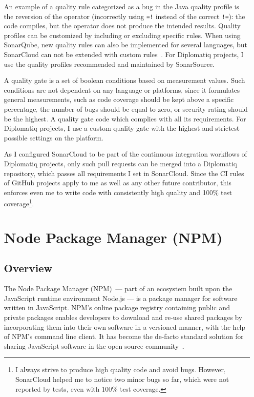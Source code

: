 An example of a quality rule categorized as a bug in the Java quality profile is the reversion of the  operator (incorrectly using \lstinline{=!} instead of the correct \lstinline{!=}): the code compiles, but the operator does not produce the intended results. Quality profiles can be customized by including or excluding specific rules. When using SonarQube, new quality rules can also be implemented for several languages, but SonarCloud can not be extended with custom rules~\cite{sonar-custom-rules}. For Diplomatiq projects, I use the quality profiles recommended and maintained by SonarSource.

A quality gate is a set of boolean conditions based on measurement values. Such conditions are not dependent on any language or platforms, since it formulates general measurements, such as code coverage should be kept above a specific percentage, the number of bugs should be equal to zero, or security rating should be the highest. A quality gate  code which complies with all its requirements. For Diplomatiq projects, I use a custom quality gate with the highest and strictest possible settings on the platform.

As I configured SonarCloud to be part of the continuous integration workflows of Diplomatiq projects, only such pull requests can be merged into a Diplomatiq repository, which passes all requirements I set in SonarCloud. Since the CI rules of GitHub projects apply to me as well as any other future contributor, this enforces even me to write code with consistently high quality and 100\% test coverage\footnote{I always strive to produce high quality code and avoid bugs. However, SonarCloud helped me to notice two minor bugs so far, which were not reported by tests, even with 100\% test coverage.}.

\section{Node Package Manager (NPM)}

\subsection{Overview}

The Node Package Manager (NPM) — part of an ecosystem built upon the JavaScript runtime environment Node.js — is a package manager for software written in JavaScript. NPM's online package registry containing public and private packages enables developers to download and re-use shared packages by incorporating them into their own software in a versioned manner, with the help of NPM's command line client. It has become the de-facto standard solution for sharing JavaScript software in the open-source community~\cite{herron2016node}.

